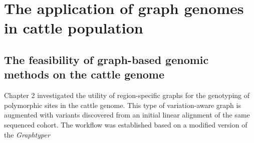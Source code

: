 \documentclass[../main.tex]{subfiles}
\begin{document}
\section{The application of graph genomes in cattle population}

\subsection*{The feasibility of graph-based genomic methods on the cattle genome}

Chapter 2 investigated the utility of region-specific graphs for the genotyping of polymorphic sites in the cattle genome. This type of variation-aware graph is augmented with variants discovered from an initial linear alignment of the same sequenced cohort. The workflow was established based on a modified version of the \emph{Graphtyper} 
\end{document}
